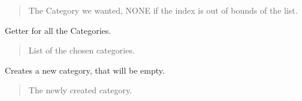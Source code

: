 \documentclass[letterpaper,10pt,english]{sphinxmanual}
\begin{document}
\begin{fulllineitems}
\begin{fulllineitems}
\begin{quote}
\begin{description}
\sphinxAtStartPar
The Category we wanted, NONE if the index is out of bounds of the list.

\sphinxAtStartPar
{\hyperref[\detokenize{apidoc/src.osm_configurator.model.project.configuration:src.osm_configurator.model.project.configuration.category.Category}]{}}

\end{description}\end{quote}

\end{fulllineitems}


\begin{fulllineitems}
\label{\detokenize{apidoc/src.osm_configurator.model.project:src.osm_configurator.model.project.active_project.ActiveProject.get_categories}}
\pysigstartsignatures
{}
\pysigstopsignatures
\sphinxAtStartPar
Getter for all the Categories.
\begin{quote}\begin{description}
\sphinxAtStartPar
List of the chosen categories.

\sphinxAtStartPar
{}

\end{description}\end{quote}

\end{fulllineitems}


\begin{fulllineitems}
\label{\detokenize{apidoc/src.osm_configurator.model.project:src.osm_configurator.model.project.active_project.ActiveProject.create_category}}
\pysigstartsignatures
{}
\pysigstopsignatures
\sphinxAtStartPar
Creates a new category, that will be empty.
\begin{quote}\begin{description}
\sphinxAtStartPar
The newly created category.


\end{description}
\end{quote}
\end{fulllineitems}
\end{fulllineitems}
\end{document}
